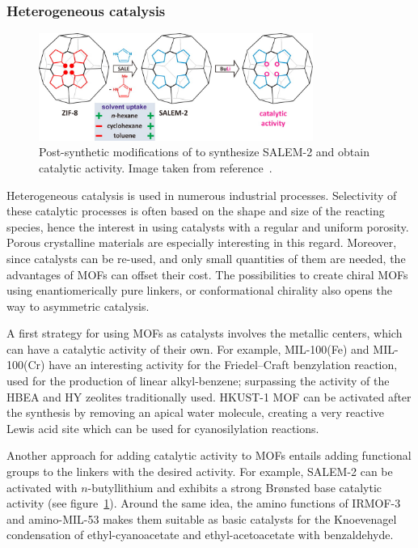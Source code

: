 \documentclass[thesis]{subfiles}
\begin{document}
\subsubsection{Heterogeneous catalysis}

\begin{figure}[ht]
    \centering
    \includegraphics[width=0.8\textwidth]{figures/cited/zif8-to-salem2}
    \caption{Post-synthetic modifications of  to synthesize SALEM-2 and
    obtain catalytic activity. Image taken from reference~\cite{Karagiaridi2012}.}
    \label{fig:zif8-to-salem2}
\end{figure}

Heterogeneous catalysis is used in numerous industrial processes. Selectivity of
these catalytic processes is often based on the shape and size of the reacting
species, hence the interest in using catalysts with a regular and uniform
porosity.  Porous crystalline materials are especially interesting in this
regard.  Moreover, since catalysts can be re-used, and only small quantities of
them are needed, the advantages of MOFs can offset their cost. The possibilities
to create chiral MOFs using enantiomerically pure linkers, or conformational
chirality\cite{Tshabang2018} also opens the way to asymmetric catalysis.

A first strategy for using MOFs as catalysts involves the metallic centers,
which can have a catalytic activity of their own. For example, MIL-100(Fe) and
MIL-100(Cr) have an interesting activity for the Friedel--Craft benzylation
reaction, used for the production of linear alkyl-benzene; surpassing the
activity of the HBEA and HY zeolites traditionally used\cite{Horcajada2007}.
HKUST-1 MOF can be activated after the synthesis by removing an apical water
molecule, creating a very reactive Lewis acid site which can be used for
cyanosilylation reactions\cite{Schlichte2004}.

Another approach for adding catalytic activity to MOFs entails adding functional
groups to the linkers with the desired activity. For example, SALEM-2 can be
activated with $n$-butyllithium and exhibits a strong Brønsted base catalytic
activity\cite{Karagiaridi2012} (see figure~\ref{fig:zif8-to-salem2}). Around
the same idea, the amino functions of IRMOF-3 and amino-MIL-53 makes them
suitable as basic catalysts for the Knoevenagel condensation of
ethyl-cyanoacetate and ethyl-acetoacetate with benzaldehyde\cite{Gascon2009}.
\end{document}
